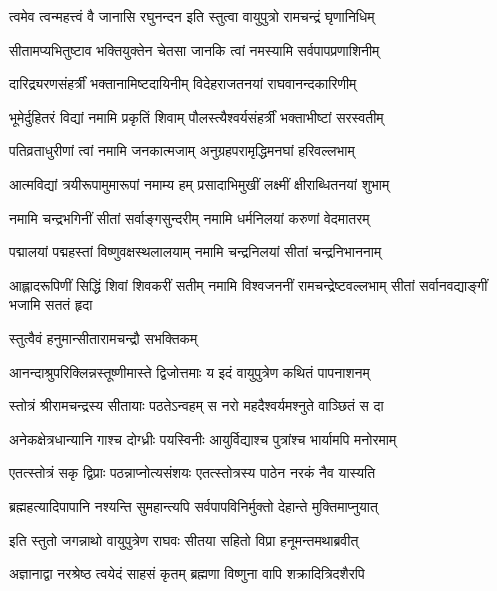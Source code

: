 \twolineshloka
{त्वमेव त्वन्महत्त्वं वै जानासि रघुनन्दन}
{इति स्तुत्वा वायुपुत्रो रामचन्द्रं घृणानिधिम्}%

\twolineshloka
{सीतामप्यभितुष्टाव भक्तियुक्तेन चेतसा}
{जानकि त्वां नमस्यामि सर्वपापप्रणाशिनीम्}%

\twolineshloka
{दारिद्र्यरणसंहर्त्रीं भक्तानामिष्टदायिनीम्}
{विदेहराजतनयां राघवानन्दकारिणीम्}%

\twolineshloka
{भूमेर्दुहितरं विद्यां नमामि प्रकृतिं शिवाम्}
{पौलस्त्यैश्वर्यसंहर्त्रीं भक्ताभीष्टां सरस्वतीम्}%

\twolineshloka
{पतिव्रताधुरीणां त्वां नमामि जनकात्मजाम्}
{अनुग्रहपरामृद्धिमनघां हरिवल्लभाम्}%

\twolineshloka
{आत्मविद्यां त्रयीरूपामुमारूपां नमाम्य हम्}
{प्रसादाभिमुखीं लक्ष्मीं क्षीराब्धितनयां शुभाम्}%

\twolineshloka
{नमामि चन्द्रभगिनीं सीतां सर्वाङ्गसुन्दरीम्}
{नमामि धर्मनिलयां करुणां वेदमातरम्}%

\twolineshloka
{पद्मालयां पद्महस्तां विष्णुवक्षस्थलालयाम्}
{नमामि चन्द्रनिलयां सीतां चन्द्रनिभाननाम्}%

\threelineshloka
{आह्लादरूपिणीं सिद्धिं शिवां शिवकरीं सतीम्}
{नमामि विश्वजननीं रामचन्द्रेष्टवल्लभाम्}
{सीतां सर्वानवद्याङ्गीं भजामि सततं हृदा}%



\onelineshloka
{स्तुत्वैवं हनुमान्सीतारामचन्द्रौ सभक्तिकम्}%

\twolineshloka
{आनन्दाश्रुपरिक्लिन्नस्तूष्णीमास्ते द्विजोत्तमाः}
{य इदं वायुपुत्रेण कथितं पापनाशनम्}%

\twolineshloka
{स्तोत्रं श्रीरामचन्द्रस्य सीतायाः पठतेऽन्वहम्}
{स नरो महदैश्वर्यमश्नुते वाञ्छितं स दा}%

\twolineshloka
{अनेकक्षेत्रधान्यानि गाश्च दोग्ध्रीः पयस्विनीः}
{आयुर्विद्याश्च पुत्रांश्च भार्यामपि मनोरमाम्}%

\twolineshloka
{एतत्स्तोत्रं सकृ द्विप्राः पठन्नाप्नोत्यसंशयः}
{एतत्स्तोत्रस्य पाठेन नरकं नैव यास्यति}%

\twolineshloka
{ब्रह्महत्यादिपापानि नश्यन्ति सुमहान्त्यपि}
{सर्वपापविनिर्मुक्तो देहान्ते मुक्तिमाप्नुयात्}%

\twolineshloka
{इति स्तुतो जगन्नाथो वायुपुत्रेण राघवः}
{सीतया सहितो विप्रा हनूमन्तमथाब्रवीत्}%


\twolineshloka
{अज्ञानाद्वा नरश्रेष्ठ त्वयेदं साहसं कृतम्}
{ब्रह्मणा विष्णुना वापि शक्रादित्रिदशैरपि}%

